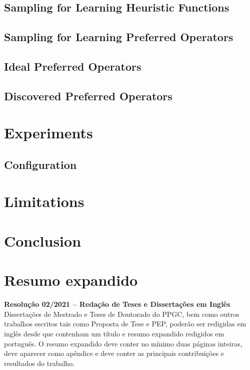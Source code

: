 \documentclass[ppgc,diss,english]{iiufrgs}
\begin{document}
\section{Sampling for Learning Heuristic Functions}

\section{Sampling for Learning Preferred Operators}

\section{Ideal Preferred Operators}

\section{Discovered Preferred Operators}

%
%
\chapter{Experiments}

\section{Configuration}

\chapter{Limitations}

\chapter{Conclusion}




\appendix

\chapter{Resumo expandido}

\noindent
\textbf{Resolução 02/2021 -- Redação de Teses e Dissertações em Inglês}
Dissertações de Mestrado e Teses de Doutorado do PPGC, bem como outros
trabalhos escritos tais como Proposta de Tese e PEP, poderão ser
redigidas em inglês desde que contenham um título e resumo expandido
redigidos em português. O resumo expandido deve conter no mínimo duas
páginas inteiras, deve aparecer como apêndice e deve conter as
principais contribuições e resultados do trabalho.
\end{document}

